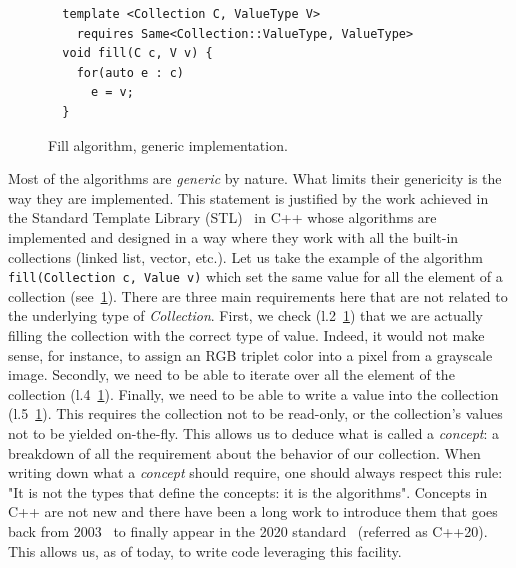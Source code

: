\begin{figure}[tbh]
  \centering
  \begin{verbatim}
  template <Collection C, ValueType V>
    requires Same<Collection::ValueType, ValueType>
  void fill(C c, V v) {
    for(auto e : c)
      e = v;
  }
  \end{verbatim}

  \caption{Fill algorithm, generic implementation.}
  \label{fig.gen.fill}
\end{figure}

Most of the algorithms are \emph{generic} by nature. What limits their genericity is the way they are implemented. This
statement is justified by the work achieved in the Standard Template Library (STL)~\parencite{dehnert.1998.fundamentals} in
C++ whose algorithms are implemented and designed in a way where they work with all the built-in collections (linked
list, vector, etc.). Let us take the example of the algorithm \texttt{fill(Collection c, Value v)} which set the same
value for all the element of a collection (see~\cref{fig.gen.fill}). There are three main requirements here that are not
related to the underlying type of \emph{Collection}. First, we check (l.2~\ref{fig.gen.fill}) that we are actually
filling the collection with the correct type of value. Indeed, it would not make sense, for instance, to assign an RGB
triplet color into a pixel from a grayscale image. Secondly, we need to be able to iterate over all the element of the
collection (l.4~\ref{fig.gen.fill}). Finally, we need to be able to write a value into the collection
(l.5~\ref{fig.gen.fill}). This requires the collection not to be read-only, or the collection's values not to be yielded
on-the-fly. This allows us to deduce what is called a \emph{concept}: a breakdown of all the requirement about the
behavior of our collection. When writing down what a \emph{concept} should require, one should always respect this rule:
"It is not the types that define the concepts: it is the algorithms". Concepts in C++ are not new and there have been a
long work to introduce them that goes back from
2003~\parencite{seymour.2009.concepts,stroustrup.2003.concepts,sutton.2017.concepts} to finally appear in the 2020
standard~\cite{voutilainen.2017.concepts} (referred as C++20). This allows us, as of today, to write code leveraging
this facility.


